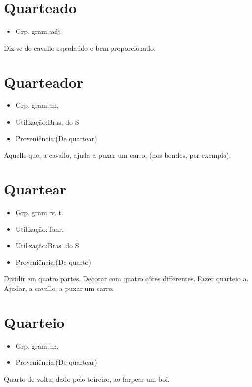 \section{Quarteado}
\begin{itemize}
\item {Grp. gram.:adj.}
\end{itemize}
Diz-se do cavallo espadaúdo e bem proporcionado.
\section{Quarteador}
\begin{itemize}
\item {Grp. gram.:m.}
\end{itemize}
\begin{itemize}
\item {Utilização:Bras. do S}
\end{itemize}
\begin{itemize}
\item {Proveniência:(De \textunderscore quartear\textunderscore )}
\end{itemize}
Aquelle que, a cavallo, ajuda a puxar um carro, (nos bondes, por exemplo).
\section{Quartear}
\begin{itemize}
\item {Grp. gram.:v. t.}
\end{itemize}
\begin{itemize}
\item {Utilização:Taur.}
\end{itemize}
\begin{itemize}
\item {Utilização:Bras. do S}
\end{itemize}
\begin{itemize}
\item {Proveniência:(De \textunderscore quarto\textunderscore )}
\end{itemize}
Dividir em quatro partes.
Decorar com quatro côres differentes.
Fazer quarteio a.
Ajudar, a cavallo, a puxar um carro.
\section{Quarteio}
\begin{itemize}
\item {Grp. gram.:m.}
\end{itemize}
\begin{itemize}
\item {Proveniência:(De \textunderscore quartear\textunderscore )}
\end{itemize}
Quarto de volta, dado pelo toireiro, ao farpear um boi.
